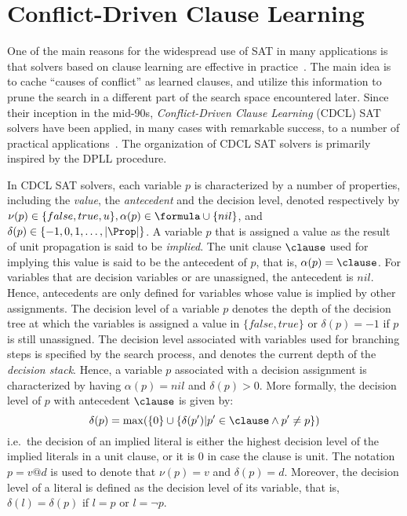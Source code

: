 \section{Conflict-Driven Clause Learning}%
\label{sec:cdcl}

One of the main reasons for the widespread use of SAT in many applications is
that solvers based on clause learning are effective in
practice~\cite{satchapter}. The main idea is to cache ``causes of conflict'' as
learned clauses, and utilize this information to prune the search in a different
part of the search space encountered later. Since their inception in the
mid-90s, \emph{Conflict-Driven Clause Learning} (CDCL) SAT solvers have been
applied, in many cases with remarkable success, to a number of practical
applications~\cite{cdclchapter}. The organization of CDCL SAT solvers is
primarily inspired by the DPLL procedure.

In CDCL SAT solvers, each variable $p$ is characterized by a number of
properties, including the \emph{value}, the \emph{antecedent} and the
decision level, denoted respectively by $\nu(p) \in \{false, true, u\},
\alpha(p) \in \formula \cup \{nil\}$, and $\delta(p) \in \{-1, 0, 1, \ldots,
|\Prop|\}$. A variable $p$ that is assigned a value as the result of unit
propagation is said to be \emph{implied}. The unit clause $\clause$ used for
implying this value is said to be the antecedent of $p$, that is, $\alpha(p) =
\clause$. For variables that are decision variables or are unassigned, the
antecedent is $nil$. Hence, antecedents are only defined for variables whose
value is implied by other assignments. The decision level of a variable $p$
denotes the depth of the decision tree at which the variables is assigned a
value in $\{false, true\}$ or $\delta(p) = -1$ if $p$ is still unassigned. The
decision level associated with variables used for branching steps is specified
by the search process, and denotes the current depth of the \emph{decision
stack}. Hence, a variable $p$ associated with a decision assignment is
characterized by having $\alpha(p) = nil$ and $\delta(p) > 0$. More formally,
the decision level of $p$ with antecedent $\clause$ is given by: 
\begin{equation}
    \delta(p) = \max(\{0\} \cup \{\delta(p') | p' \in \clause \land p' \neq p\})
\end{equation}
i.e.\ the decision of an implied literal is either the highest decision level of
the implied literals in a unit clause, or it is 0 in case the clause is unit.
The notation $p = v @ d$ is used to denote that $\nu(p) = v$ and $\delta(p) =
d$. Moreover, the decision level of a literal is defined as the decision level
of its variable, that is, $\delta(l) = \delta(p)$ if $l = p$ or $l = \neg p$.

